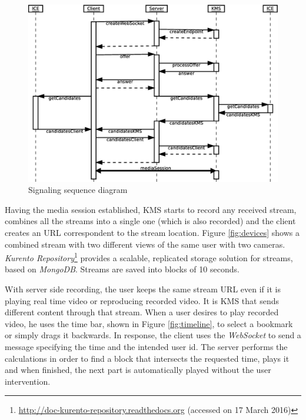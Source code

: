 \documentclass[10pt,conference]{IEEEtran}
\begin{document}
\begin{figure}
    \centering
    \includegraphics[width=\linewidth]{figures/signaling2}
    \caption{Signaling sequence diagram}
    \label{fig:signaling2}
\end{figure} 

Having the media session established, \gls{KMS} starts to record any received stream, combines all the streams into a single one (which is also recorded) and the client creates an \gls{URL} correspondent to the stream location.
Figure \ref{fig:devices} shows a combined stream with two different views of the same user with two cameras.
\emph{Kurento Repository}\footnote{\url{http://doc-kurento-repository.readthedocs.org} (accessed on 17 March 2016)} provides a scalable, replicated storage solution for streams, based on \emph{MongoDB}.
Streams are saved into blocks of 10 seconds.

With server side recording, the user keeps the same stream \gls{URL} even if it is playing real time video or reproducing recorded video. 
It is \gls{KMS} that sends different content through that stream.
When a user desires to play recorded video, he uses the time bar, shown in Figure \ref{fig:timeline}, to select a bookmark or simply drags it backwards.
In response, the client uses the \emph{WebSocket} to send a message specifying the time and the intended user id.
The server performs the calculations in order to find a block that intersects the requested time, plays it and when finished, the next part is automatically played without the user intervention.
\end{document}
